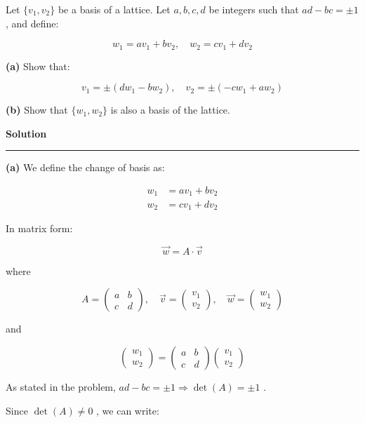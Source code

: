 \documentclass[a4paper,12pt]{article}
\begin{document}
Let \(\{v_1, v_2\}\) be a basis of a lattice. Let \(a, b, c, d\) be
integers such that \(ad - bc = \pm 1\), and define:

\[
w_1 = a v_1 + b v_2, \quad w_2 = c v_1 + d v_2
\]

\textbf{(a)} Show that:

\[
v_1 = \pm (d w_1 - b w_2), \quad v_2 = \pm (-c w_1 + a w_2)
\]

\textbf{(b)} Show that \(\{w_1, w_2\}\) is also a basis of the lattice.

    \textbf{Solution}

\begin{center}\rule{0.5\linewidth}{0.5pt}\end{center}

\textbf{(a)} We define the change of basis as:

\[
\begin{aligned}
w_1 &= a v_1 + b v_2 \\
w_2 &= c v_1 + d v_2
\end{aligned}
\]

In matrix form:

\[
\vec{w} = A \cdot \vec{v}
\]

where

\[
A =
\begin{pmatrix}
a & b \\
c & d
\end{pmatrix}, \quad
\vec{v} =
\begin{pmatrix}
v_1 \\
v_2
\end{pmatrix}, \quad
\vec{w} =
\begin{pmatrix}
w_1 \\
w_2
\end{pmatrix}
\]

and

\[
\begin{pmatrix}
w_1 \\
w_2
\end{pmatrix}
=
\begin{pmatrix}
a & b \\
c & d
\end{pmatrix}
\begin{pmatrix}
v_1 \\
v_2
\end{pmatrix}
\]

As stated in the problem,
\(ad - bc = \pm 1 \Rightarrow \det(A) = \pm 1\) .

Since \(\det(A) \neq 0\) , we can write:
\end{document}
